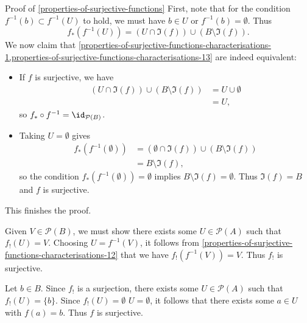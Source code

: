 \begin{Proof}{Proof of \cref{properties-of-surjective-functions}}
    First, note that for the condition $f^{-1}(b)\subset f^{-1}(U)$ to hold, we must have $b\in U$ or $f^{-1}(b)=\emptyset$. Thus
    \[
        f_{*}(f^{-1}(U))%
        =%
        (U\cap\Im(f))%
        \cup%
        (B\setminus\Im(f)).%
    \]%
    We now claim that \cref{properties-of-surjective-functions-characterisations-1,properties-of-surjective-functions-characterisations-13} are indeed equivalent:
    \begin{itemize}
        \item{}If $f$ is surjective, we have
            \begin{align*}
                (U\cap\Im(f))\cup(B\setminus\Im(f)) &= U\cup\emptyset\\
                                                    &= U,
            \end{align*}
            so $f_{*}\circ f^{-1}=\id_{\mathcal{P}(B)}$.
        \item{}Taking $U=\emptyset$ gives
            \begin{align*}
                f_{*}(f^{-1}(\emptyset)) &= (\emptyset\cap\Im(f))\cup(B\setminus\Im(f))\\%
                                         &= B\setminus\Im(f),%
            \end{align*}
            so the condition $f_{*}(f^{-1}(\emptyset))=\emptyset$ implies $B\setminus\Im(f)=\emptyset$. Thus $\Im(f)=B$ and $f$ is surjective.
    \end{itemize}
    This finishes the proof.

    Given $V\in\mathcal{P}(B)$, we must show there exists some $U\in\mathcal{P}(A)$ such that $f_{!}(U)=V$. Choosing $U=f^{-1}(V)$, it follows from \cref{properties-of-surjective-functions-characterisations-12} that we have $f_{!}(f^{-1}(V))=V$. Thus $f_{!}$ is surjective.

    Let $b\in B$. Since $f_{!}$ is a surjection, there exists some $U\in\mathcal{P}(A)$ such that $f_{!}(U)=\{b\}$. Since $f_{!}(U)=\emptyset$ \textiff $U=\emptyset$, it follows that there exists some $a\in U$ with $f(a)=b$. Thus $f$ is surjective.


\end{Proof}
